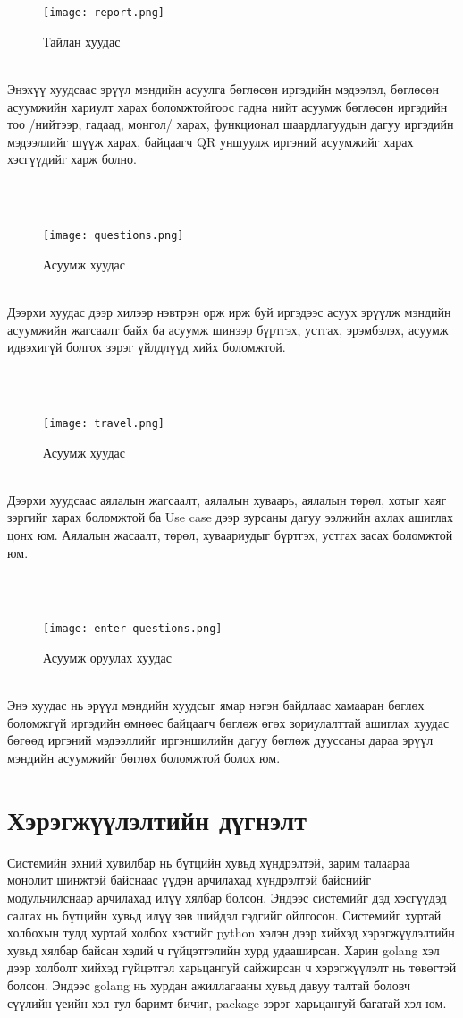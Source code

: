 \\\
\begin{figure}[H]
\texttt{[image: report.png]}
\caption{Тайлан хуудас}
\end{figure}
\\
Энэхүү хуудсаас эрүүл мэндийн асуулга бөглөсөн иргэдийн мэдээлэл, бөглөсөн асуумжийн хариулт харах боломжтойгоос гадна нийт асуумж бөглөсөн иргэдийн тоо /нийтээр, гадаад, монгол/ харах, функционал шаардлагуудын дагуу иргэдийн мэдээллийг шүүж харах, байцаагч QR уншуулж иргэний асуумжийг харах хэсгүүдийг харж болно.

\\\
\begin{figure}[H]
\texttt{[image: questions.png]}
\caption{Асуумж хуудас}
\end{figure}
\\
Дээрхи хуудас дээр хилээр нэвтрэн орж ирж буй иргэдээс асуух эрүүлж мэндийн асуумжийн жагсаалт байх ба асуумж шинээр бүртгэх, устгах, эрэмбэлэх, асуумж идвэхигүй болгох зэрэг үйлдлүүд хийх боломжтой.

\\\
\begin{figure}[H]
\texttt{[image: travel.png]}
\caption{Асуумж хуудас}
\end{figure}
\\

Дээрхи хуудсаас аялалын жагсаалт, аялалын хуваарь, аялалын төрөл, хотыг хаяг зэргийг харах боломжтой ба Use case дээр зурсаны дагуу ээлжийн ахлах ашиглах цонх юм. Аялалын жасаалт, төрөл, хуваариудыг бүртгэх, устгах засах боломжтой юм.

\\\
\begin{figure}[H]
\texttt{[image: enter-questions.png]}
\caption{Асуумж оруулах хуудас}
\end{figure}
\\
Энэ хуудас нь эрүүл мэндийн хуудсыг ямар нэгэн байдлаас хамааран бөглөх боломжгүй иргэдийн өмнөөс байцаагч бөглөж өгөх зориулалттай ашиглах хуудас бөгөөд иргэний мэдээллийг иргэншилийн дагуу бөглөж дууссаны дараа эрүүл мэндийн асуумжийг бөглөх боломжтой болох юм.

\section{Хэрэгжүүлэлтийн дүгнэлт} 

Системийн эхний хувилбар нь бүтцийн хувьд хүндрэлтэй, зарим талаараа монолит шинжтэй байснаас үүдэн арчилахад хүндрэлтэй байснийг модульчилснаар арчилахад илүү хялбар болсон. Эндээс системийг дэд хэсгүүдэд салгах нь бүтцийн хувьд илүү зөв шийдэл гэдгийг ойлгосон. Системийг хуртай холбохын тулд хуртай холбох хэсгийг python хэлэн дээр хийхэд хэрэгжүүлэлтийн хувьд хялбар байсан хэдий ч гүйцэтгэлийн хурд удааширсан. Харин golang хэл дээр холболт хийхэд гүйцэтгэл харьцангуй сайжирсан ч хэрэгжүүлэлт нь төвөгтэй болсон. Эндээс golang нь хурдан ажиллагааны хувьд давуу талтай боловч сүүлийн үеийн хэл тул баримт бичиг, package зэрэг харьцангуй багатай хэл юм. 

